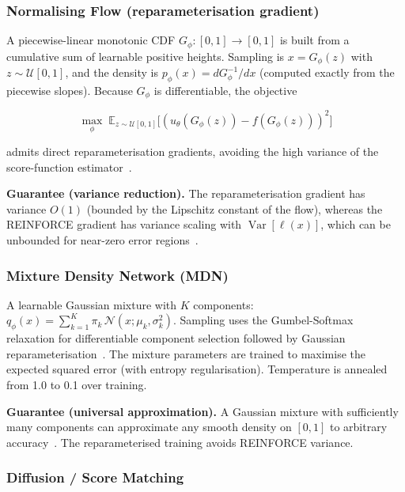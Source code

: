 \documentclass[11pt,a4paper]{article}
\begin{document}
\subsubsection{Normalising Flow (reparameterisation gradient)}
\label{sec:flow}

A piecewise-linear monotonic CDF $G_\phi:[0,1]\to[0,1]$ is built from a
cumulative sum of learnable positive heights.  Sampling is
$x = G_\phi(z)$ with $z\sim\mathcal{U}[0,1]$, and the density is
$p_\phi(x) = dG_\phi^{-1}/dx$ (computed exactly from the piecewise
slopes).  Because $G_\phi$ is differentiable, the objective

\begin{equation}
  \max_\phi\; \mathbb{E}_{z\sim\mathcal{U}[0,1]}\bigl[
    (u_\theta(G_\phi(z))-f(G_\phi(z)))^2 \bigr]
\end{equation}

admits direct reparameterisation gradients, avoiding the high variance
of the score-function estimator~\citep{rezende2015variational,kingma2013auto}.

\textbf{Guarantee (variance reduction).}
The reparameterisation gradient has variance $O(1)$ (bounded by the
Lipschitz constant of the flow), whereas the REINFORCE gradient has
variance scaling with $\operatorname{Var}[\ell(x)]$, which can be
unbounded for near-zero error regions~\citep{xu2019understanding}.

\subsubsection{Mixture Density Network (MDN)}
\label{sec:mdn}

A learnable Gaussian mixture with $K$ components:
$q_\phi(x) = \sum_{k=1}^K \pi_k\,\mathcal{N}(x;\mu_k,\sigma_k^2)$.
Sampling uses the Gumbel-Softmax relaxation for differentiable component
selection followed by Gaussian reparameterisation~\citep{jang2016categorical,maddison2016concrete}.
The mixture parameters are trained to maximise the expected squared
error (with entropy regularisation).  Temperature is annealed from 1.0
to 0.1 over training.

\textbf{Guarantee (universal approximation).}
A Gaussian mixture with sufficiently many components can approximate any
smooth density on $[0,1]$ to arbitrary accuracy~\citep{mclachlan2019finite}.
The reparameterised training avoids REINFORCE variance.

\subsubsection{Diffusion / Score Matching}
\label{sec:diffusion}
\end{document}
